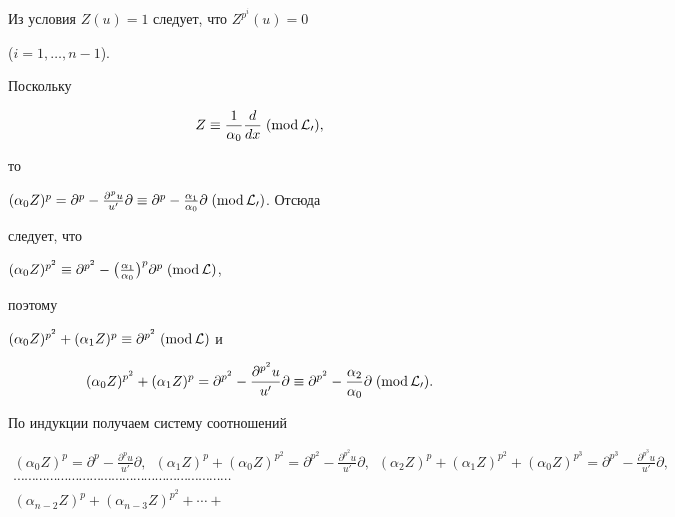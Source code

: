 \begin{pf} Из условия $Z(u)=1$ следует, что $Z^{p^i}(u)=0$ 


($i=1,\dotsc,n-1$). 


Поскольку 


$$ 


Z\equiv\frac{1}{\alpha_0}\frac{d}{dx}\;(\Mod\cal L_0), 


$$ 


то 


$(\alpha_0Z)^p=\partial^p-\frac{\partial^p u}{u'}\partial\equiv 


\partial^p-\frac{\alpha_1}{\alpha_0}\partial\;(\Mod\cal L_0)$. Отсюда 


следует, что 


$(\alpha_0Z)^{p^2}\equiv\partial^{p^2}-\big( 


\frac{\alpha_1}{\alpha_0}\big)^p\partial^p\;(\Mod\cal L)$, 


поэтому 


$(\alpha_0Z)^{p^2}+(\alpha_1Z)^p\equiv\partial^{p^2}\;(\operatorname{mod}\cal L)$ и 


$$ 


(\alpha_0Z)^{p^2}+(\alpha_1Z)^p=\partial^{p^2}- 


\frac{\partial^{p^2}u}{u'}\partial\equiv 


\partial^{p^2}-\frac{\alpha_2}{\alpha_0}\partial 


\;(\Mod \cal L_0). 


$$ 


По индукции получаем систему соотношений 


\begin{gather*} 


(\alpha_0Z)^p=\partial^p- 


\frac{\partial^p u}{u'}\partial,\ \;


(\alpha_1Z)^p+(\alpha_0Z)^{p^2}= 


\partial^{p^2}-\frac{\partial^{p^2}u}{u'}\partial,\ \;


(\alpha_2Z)^p+(\alpha_1Z)^{p^2}+(\alpha_0Z)^{p^3}= 


\partial^{p^3}-\frac{\partial^{p^3}u}{u'}\partial,\\ 


\dotsb\dotsb\dotsb\dotsb\dotsb\dotsb\dotsb\dotsb\dotsb\dotsb


\dotsb\dotsb\dotsb\dotsb\dotsb\dotsb\dotsb\dotsb\dotsb\dotsb\\ 


(\alpha_{n-2}Z)^p+(\alpha_{n-3}Z)^{p^2}+\dotsb+ 



\end{gather*}
\end{pf}
